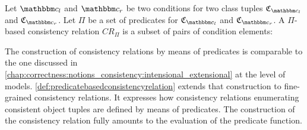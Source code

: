 \begin{definition} \label{def:predicatebasedconsistencyrelation}
Let $\condition{c}{l}$ and $\condition{c}{r}$ be two conditions for two class tuples $\classtuple{C}{\condition{c}{l}}$ and $\classtuple{C}{\condition{c}{r}}$. 
Let $\Pi$ be a set of predicates for $\classtuple{C}{\condition{c}{l}}$ and $\classtuple{C}{\condition{c}{r}}$. A $\Pi$-based consistency relation $CR_{\Pi}$ is a subset of pairs of condition elements:
%
\end{definition}

The construction of consistency relations by means of predicates is comparable to the one discussed in \autoref{chap:correctness:notions_consistency:intensional_extensional} at the level of models.
\autoref{def:predicatebasedconsistencyrelation} extends that construction to fine-grained consistency relations.
It expresses how consistency relations enumerating consistent object tuples are defined by means of predicates.
The construction of the consistency relation fully amounts to the evaluation of the predicate function.

